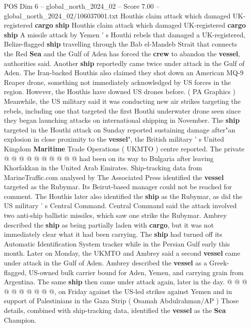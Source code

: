 \begin{textsample}{POS Dim 6 – global\_north\_2024\_02 – Score 7.00 – global\_north\_2024\_02/106037001.txt}  \label{ex:f6_pos_176}
Houthis claim attack which damaged UK-registered \textbf{cargo} \textbf{ship} Houthis claim attack which damaged UK-registered \textbf{cargo} \textbf{ship} A missile attack by Yemen ' s Houthi rebels that damaged a UK-registered, Belize-flagged \textbf{ship} travelling through the Bab el-Mandeb Strait that connects the Red \textbf{Sea} and the Gulf of Aden has forced the \textbf{crew} to abandon the \textbf{vessel}, authorities said.
Another \textbf{ship} reportedly came twice under attack in the Gulf of Aden.
The Iran-backed Houthis also claimed they shot down an American MQ-9 Reaper drone, something not immediately acknowledged by US forces in the region.
However, the Houthis have downed US drones before. ( PA Graphics ) Meanwhile, the US military said it was conducting new air strikes targeting the rebels, including one that targeted the first Houthi underwater drone seen since they began launching attacks on international shipping in November.
The \textbf{ship} targeted in the Houthi attack on Sunday reported sustaining damage after"an explosion in close proximity to the \textbf{vessel}", the British military ' s United Kingdom \textbf{Maritime} Trade Operations ( UKMTO ) centre reported.
The private @ @ @ @ @ @ @ @ @ @ had been on its way to Bulgaria after leaving Khorfakkan in the United Arab Emirates.
Ship-tracking data from MarineTraffic.com analysed by The Associated Press identified the \textbf{vessel} targeted as the Rubymar.
Its Beirut-based manager could not be reached for comment.
The Houthis later also identified the \textbf{ship} as the Rubymar, as did the US military ' s Central Command.
Central Command said the attack involved two anti-ship ballistic missiles, which saw one strike the Rubymar.
Ambrey described the \textbf{ship} as being partially laden with \textbf{cargo}, but it was not immediately clear what it had been carrying.
The \textbf{ship} had turned off its Automatic Identification System tracker while in the Persian Gulf early this month.
Later on Monday, the UKMTO and Ambrey said a second \textbf{vessel} came under attack in the Gulf of Aden.
Ambrey described the \textbf{vessel} as a Greek-flagged, US-owned bulk carrier bound for Aden, Yemen, and carrying grain from Argentina.
The same \textbf{ship} then came under attack again, later in the day. @ @ @ @ @ @ @ @ @ @, on Friday against the US-led strikes against Yemen and in support of Palestinians in the Gaza Strip ( Osamah Abdulrahman/AP ) Those details, combined with ship-tracking data, identified the \textbf{vessel} as the \textbf{Sea} Champion.

\end{textsample}

